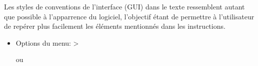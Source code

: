 
Les styles de conventions de l'interface (GUI) dans le texte ressemblent autant que possible \`a l'apparrence du logiciel, l'objectif \'etant de permettre \`a l'utilisateur de rep\'erer plus facilement les \'el\'ements mentionn\'es dans les instructions.

\begin{itemize}
%
\item Options du menu:  > %
%
% 
% 

ou


\end{itemize}
